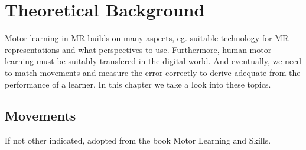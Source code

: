 \chapter{Theoretical Background}

Motor learning in MR builds on many aspects, eg. suitable technology for MR representations and what perspectives to use. Furthermore, human motor learning must be suitably transfered in the digital world. And eventually, we need to match movements and measure the error correctly to derive adequate from the performance of a learner. In this chapter we take a look into these topics. 

\section{Movements}
If not other indicated, adopted from the book Motor Learning and Skills\cite{Schmidt2011}.
